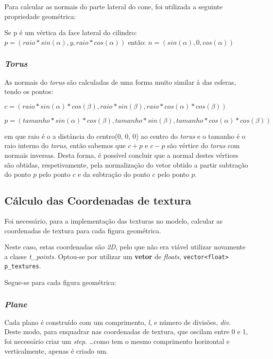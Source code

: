 \documentclass[relatorio.tex]{subfiles}
\begin{document}
Para calcular as normais do parte lateral do cone, foi utilizada a seguinte propriedade
geométrica:

Se p é um vértica da face lateral do cilindro:
$ p = (raio * sin(\alpha), y, raio * cos(\alpha))$
então:
$ n = (sin(\alpha), 0, cos(\alpha))$

\subsubsection{\textit{Torus}}
As normais do \textit{torus} são calculadas de uma forma muito similar à das esferas,
tendo os pontos:

$ c = (raio * sin(\alpha) * cos(\beta), raio * sin(\beta), raio * cos(\alpha) * cos(\beta))$

$ p = (tamanho * sin(\alpha) * cos(\beta), tamanho * sin(\beta), tamanho * cos(\alpha) * cos(\beta))$

em que raio é o a distância do centro(0, 0, 0) ao centro do \textit{torus} e o tamanho é o raio interno
do \textit{torus}, então sabemos que $c + p$ e $c - p$ são vértice do \textit{torus} com normais inversas. 
Desta forma, é possível concluir que a normal destes vértices são obtidas, respetivamente, pela normalização 
do vetor obtido a partir subtração do ponto $p$ pelo ponto $c$ e da subtração do ponto $c$ pelo ponto $p$.

\subsection{Cálculo das Coordenadas de textura} \label{subsec:texCoord}
Foi necessário, para a implementação das texturas no modelo,
calcular as coordenadas de textura para cada figura geométrica.

Neste caso, estas coordenadas são \textit{2D}, pelo que
não era viável utilizar novamente a classe \textit{t\_points}.
Optou-se por utilizar um \textbf{vetor} de \textit{floats},
\texttt{vector<float> p_textures}.

Segue-se para cada figura geométrica:
\subsubsection{\textit{Plane}}

Cada plano é construído com um comprimento, \textit{l}, 
e número de divisões, \textit{div}.
Deste modo, para enquadrar nas coordenadas de textura,
que oscilam entre 0 e 1, foi necessário criar 
um \textit{step}.
\dots como tem o mesmo comprimento horizontal e 
verticalmente, apenas é criado um.
\end{document}
